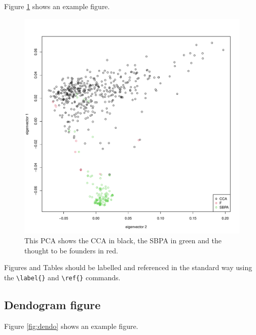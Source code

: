 \documentclass[9pt, onecolumn,twoside]{gsajnl}
\begin{document}
Figure \ref{fig:pca} shows an example figure.

\begin{figure}[t]
\centering
\includegraphics[width=\linewidth]{plot_PCA_origin.pdf}
\caption{This PCA shows the CCA in black, the SBPA in green and the thought to be founders in red.}%
\label{fig:pca}
\end{figure}


Figures and Tables should be labelled and referenced in the standard way using the \verb|\label{}| and \verb|\ref{}| commands.

\subsection{Dendogram figure}

Figure \ref{fig:dendo} shows an example figure.
\end{document}
